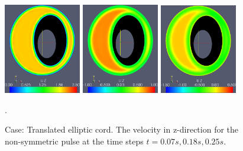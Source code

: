 \begin{figure}\begin{center}
\includegraphics[width=0.3\textwidth]{chapters/hentschel/eps/pulse_f1_08_elliptic_eccentric_sysmax_nmb7.eps}
\includegraphics[width=0.3\textwidth]{chapters/hentschel/eps/pulse_f1_08_elliptic_eccentric_sysdia_nmb18.eps}
\includegraphics[width=0.3\textwidth]{chapters/hentschel/eps/pulse_f1_08_elliptic_eccentric_diamin1_nmb25.eps}
\caption{Case: Translated elliptic cord. The velocity in z-direction for the non-symmetric pulse at the time steps $t=0.07s, 0.18s, 0.25s$.}
\label{fig:case3b}. 
\end{center}\end{figure}


